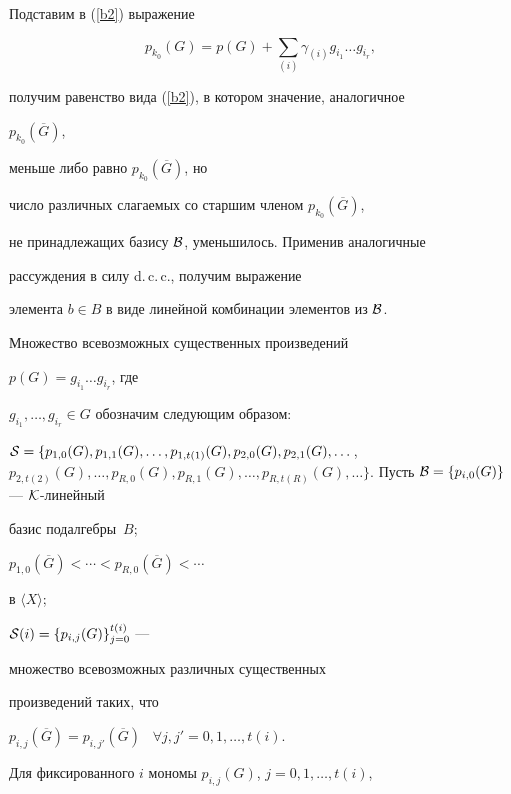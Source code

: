 Подставим в (\ref{b2}) выражение


$$


p_{k_{0}}(G)=p(G)+\sum_{(i)}\gamma_{(i)}g_{i_{1}}\dotsc g_{i_{r}},


$$


получим равенство вида (\ref{b2}), в котором значение, аналогичное


$p_{k_{0}}(\overline{G})$,


меньше либо равно $p_{k_{0}}(\overline{G})$, но


число различных слагаемых со старшим членом $p_{k_{0}}(\overline{G})$,


не принадлежащих базису $\cal B$, уменьшилось. Применив аналогичные


рассуждения в силу d.\,c.\,c., получим выражение


элемента $b\in B$ в виде линейной комбинации элементов из $\cal B$.





Множество всевозможных существенных произведений


$p(G)=g_{i_{1}}\dotsc g_{i_{r}}$, где


$g_{i_{1}},\dotsc,g_{i_{r}}\in G$ обозначим следующим образом:


${\cal S}=\lbrace p_{1,0}(G),p_{1,1}(G),\dotsc,p_{1,t(1)}(G),


p_{2,0}(G),p_{2,1}(G),\dotsc$,\linebreak $p_{2,t(2)}(G),\dotsc,




p_{R,0}(G),p_{R,1}(G),\dotsc, p_{R,t(R)}(G),\dotsc


\rbrace$. Пусть ${\cal B}=\lbrace p_{i,0}(G)\rbrace$ --- ${\cal K}$-линейный


базис подалгебры~$B$;


$p_{1,0}(\overline{G})<\dotsb<p_{R,0}(\overline{G})<\dotsb$


в $\langle X\rangle$;


${\cal S}(i)=\lbrace p_{i,j}(G)\rbrace _{j=0}^{t(i)}$ ---


множество всевозможных различных существенных


произведений таких, что


$p_{i,j}(\overline{G})=p_{i,j'}(\overline{G})$ \ $\forall


j,j'=0,1,\dotsc,t(i)$.


Для фиксированного $i$ мономы $p_{i,j}(G)$, $j=0,1,\dotsc,t(i)$,


